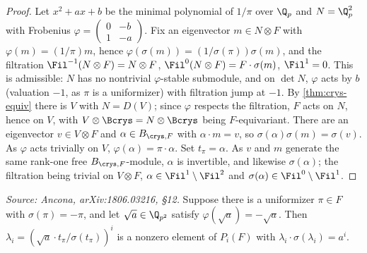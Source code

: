 \begin{proof}
  Let \(x^2 + ax + b\) be the minimal polynomial of \(1/\pi\) over \(\Q_p\) and
  \(N = \Q_p^2\) with Frobenius
  \(\varphi = \left(\begin{smallmatrix} 0 & -b \\ 1 & -a \end{smallmatrix}\right)\).
  Fix an eigenvector \(m \in N \otimes F\) with \(\varphi(m) = (1/\pi)m\), hence
  \(\varphi(\sigma(m)) = (1/\sigma(\pi))\sigma(m)\), and the filtration
  \(\Fil^{-1}(N \otimes F) = N \otimes F\), \(\Fil^0(N \otimes F) = F \cdot
  \sigma(m)\), \(\Fil^1 = 0\). This is admissible: \(N\) has no nontrivial
  \(\varphi\)-stable submodule, and on \(\det N\), \(\varphi\) acts by \(b\)
  (valuation \(-1\), as \(\pi\) is a uniformizer) with filtration jump at \(-1\).
  By \cref{thm:crys-equiv} there is \(V\) with \(N = D(V)\); since \(\varphi\)
  respects the filtration, \(F\) acts on \(N\), hence on \(V\), with
  \(V \otimes \Bcrys = N \otimes \Bcrys\) being \(F\)-equivariant. There are an
  eigenvector \(v \in V \otimes F\) and \(\alpha \in B_{\crys,F}\) with
  \(\alpha \cdot m = v\), so \(\sigma(\alpha)\sigma(m) = \sigma(v)\). As
  \(\varphi\) acts trivially on \(V\), \(\varphi(\alpha) = \pi \cdot \alpha\). Set
  \(t_\pi = \alpha\). As \(v\) and \(m\) generate the same rank-one free
  \(B_{\crys,F}\)-module, \(\alpha\) is invertible, and likewise
  \(\sigma(\alpha)\); the filtration being trivial on \(V \otimes F\),
  \(\alpha \in \Fil^1 \setminus \Fil^2\) and \(\sigma(\alpha) \in \Fil^0
  \setminus \Fil^1\).
\end{proof}

\begin{corollary}
  \label{cor:period-ram}
  \textit{Source: Ancona, arXiv:1806.03216, \S12.}
  Suppose there is a uniformizer \(\pi \in F\) with \(\sigma(\pi) = -\pi\), and
  let \(\sqrt{a} \in \Q_{p^2}\) satisfy \(\varphi(\sqrt{a}) = -\sqrt{a}\). Then
  \(\lambda_i = (\sqrt{a} \cdot t_\pi/\sigma(t_\pi))^i\) is a nonzero element of
  \(P_i(F)\) with \(\lambda_i \cdot \sigma(\lambda_i) = a^i\).
\end{corollary}

